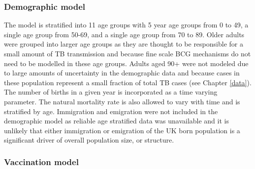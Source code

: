 \documentclass[11pt,twoside]{bristolthesis}
\begin{document}
  \hypertarget{demographic-model}{%
  \subsubsection{Demographic model}\label{demographic-model}}
  
  The model is stratified into 11 age groups with 5 year age groups from 0 to 49, a single age group from 50-69, and a single age group from 70 to 89. Older adults were grouped into larger age groups as they are thought to be responsible for a small amount of TB transmission and because fine scale BCG mechanisms do not need to be modelled in these age groups. Adults aged 90+ were not modeled due to large amounts of uncertainty in the demographic data and because cases in these population represent a small fraction of total TB cases (see Chapter \ref{data}). The number of births in a given year is incorporated as a time varying parameter. The natural mortality rate is also allowed to vary with time and is stratified by age. Immigration and emigration were not included in the demographic model as reliable age stratified data was unavailable and it is unlikely that either immigration or emigration of the UK born population is a significant driver of overall population size, or structure.
  
  \hypertarget{vaccination-model}{%
  \subsubsection{Vaccination model}\label{vaccination-model}}
  
\end{document}
